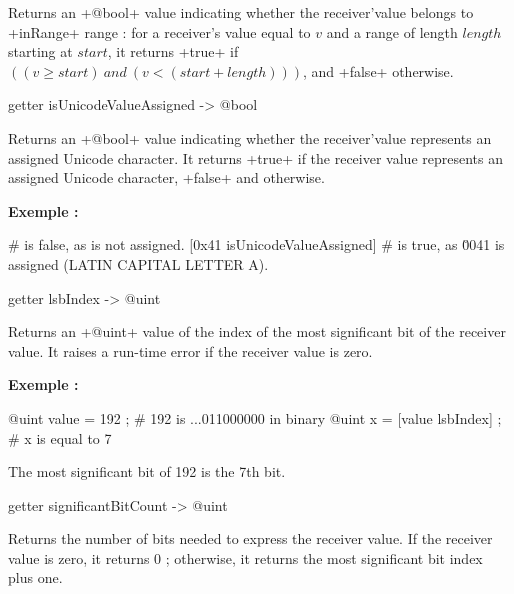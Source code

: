 {Returns an \ggs+@bool+ value indicating whether the receiver'value belongs to \ggs+inRange+ range : for a receiver's value equal to $v$ and a range of length $length$ starting at $start$, it returns \ggs+true+ if $((v \geqslant start)~and~(v<(start+length)))$, and \ggs+false+ otherwise.




\begin{galgas}
getter isUnicodeValueAssigned -> @bool
\end{galgas}

Returns an \ggs+@bool+ value indicating whether the receiver'value represents an assigned Unicode character. It returns \ggs+true+ if the receiver value represents an assigned Unicode character, \ggs+false+ and otherwise.

\textbf{Exemple :}
\begin{galgas}
 # is false, as \uFFFF is not assigned.
[0x41 isUnicodeValueAssigned] # is true, as \u0041 is assigned (LATIN CAPITAL LETTER A).
\end{galgas}




\begin{galgas}
getter lsbIndex -> @uint
\end{galgas}

Returns an \ggs+@uint+ value of the index of the most significant bit of the receiver value. It raises a run-time error if the receiver value is zero.

\textbf{Exemple :}
\begin{galgas}
@uint value = 192 ; # 192 is ...011000000 in binary
@uint x = [value lsbIndex] ; # x is equal to 7
\end{galgas}

The most significant bit of 192 is the 7th bit.





\begin{galgas}
getter significantBitCount -> @uint
\end{galgas}

Returns the number of bits needed to express the receiver value. If the receiver value is zero, it returns 0 ; otherwise, it returns the most significant bit index plus one.

}
